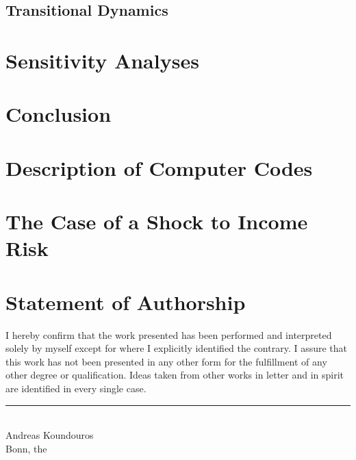 \documentclass[12pt]{article}
\numberwithin{equation}{section} %
\begin{document}
\subsection{Transitional Dynamics}
\label{sec:results-transition}

\section{Sensitivity Analyses}
\label{sec:sensitivity}

\section{Conclusion}
\label{sec:conclusion}

\newpage
\thispagestyle{plain}
\printbibliography[heading=bibintoc] %

\newpage
\thispagestyle{plain}
\renewcommand*{\thepage}{A-\arabic{page}}
\begin{appendices}
\section{Description of Computer Codes}
\label{sec-app:codes}

\section{The Case of a Shock to Income Risk}
\label{sec-app:income}
\end{appendices}

\newpage
\thispagestyle{plain}
\section*{Statement of Authorship}
I hereby confirm that the work presented has been performed and interpreted solely by myself except for where I explicitly identified the contrary. I assure that this work has not been presented in any other form for the fulfillment of any other degree or qualification. Ideas taken from other works in letter and in spirit are identified in every single case.

\vspace{2cm}
\noindent
\rule{8cm}{0.4pt}\\
Andreas Koundouros\\
Bonn, the 
\end{document}
